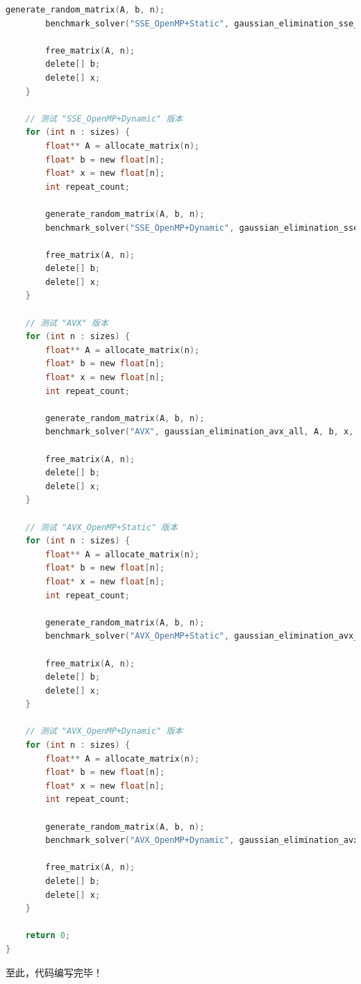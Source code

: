 \documentclass{nku}
\begin{document}
\begin{lstlisting}[language=C]
        generate_random_matrix(A, b, n);
        benchmark_solver("SSE_OpenMP+Static", gaussian_elimination_sse_static_omp, A, b, x, n, repeat_count);

        free_matrix(A, n);
        delete[] b;
        delete[] x;
    }

    // 测试 "SSE_OpenMP+Dynamic" 版本
    for (int n : sizes) {
        float** A = allocate_matrix(n);
        float* b = new float[n];
        float* x = new float[n];
        int repeat_count;

        generate_random_matrix(A, b, n);
        benchmark_solver("SSE_OpenMP+Dynamic", gaussian_elimination_sse_dynamic_omp, A, b, x, n, repeat_count);

        free_matrix(A, n);
        delete[] b;
        delete[] x;
    }

    // 测试 "AVX" 版本
    for (int n : sizes) {
        float** A = allocate_matrix(n);
        float* b = new float[n];
        float* x = new float[n];
        int repeat_count;

        generate_random_matrix(A, b, n);
        benchmark_solver("AVX", gaussian_elimination_avx_all, A, b, x, n, repeat_count);

        free_matrix(A, n);
        delete[] b;
        delete[] x;
    }

    // 测试 "AVX_OpenMP+Static" 版本
    for (int n : sizes) {
        float** A = allocate_matrix(n);
        float* b = new float[n];
        float* x = new float[n];
        int repeat_count;

        generate_random_matrix(A, b, n);
        benchmark_solver("AVX_OpenMP+Static", gaussian_elimination_avx_static_omp, A, b, x, n, repeat_count);

        free_matrix(A, n);
        delete[] b;
        delete[] x;
    }

    // 测试 "AVX_OpenMP+Dynamic" 版本
    for (int n : sizes) {
        float** A = allocate_matrix(n);
        float* b = new float[n];
        float* x = new float[n];
        int repeat_count;

        generate_random_matrix(A, b, n);
        benchmark_solver("AVX_OpenMP+Dynamic", gaussian_elimination_avx_dynamic_omp, A, b, x, n, repeat_count);

        free_matrix(A, n);
        delete[] b;
        delete[] x;
    }

    return 0;
}
\end{lstlisting}

至此，代码编写完毕！
\end{document}
